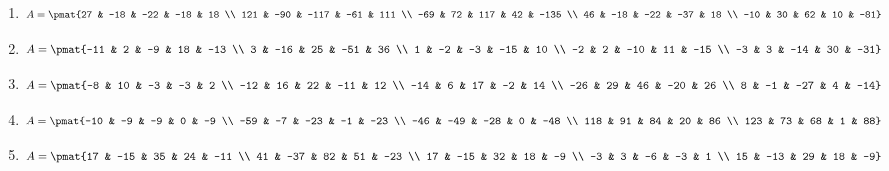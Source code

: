 \begin{enumerate}
\item

\begin{align*}
A = \pmat{27 & -18 & -22 & -18 & 18 \\ 121 & -90 & -117 & -61 & 111 \\ -69 & 72 & 117 & 42 & -135 \\ 46 & -18 & -22 & -37 & 18 \\ -10 & 30 & 62 & 10 & -81}
\end{align*}

\item

\begin{align*}
A = \pmat{-11 & 2 & -9 & 18 & -13 \\ 3 & -16 & 25 & -51 & 36 \\ 1 & -2 & -3 & -15 & 10 \\ -2 & 2 & -10 & 11 & -15 \\ -3 & 3 & -14 & 30 & -31}
\end{align*}

\item

\begin{align*}
A = \pmat{-8 & 10 & -3 & -3 & 2 \\ -12 & 16 & 22 & -11 & 12 \\ -14 & 6 & 17 & -2 & 14 \\ -26 & 29 & 46 & -20 & 26 \\ 8 & -1 & -27 & 4 & -14}
\end{align*}

\item

\begin{align*}
A = \pmat{-10 & -9 & -9 & 0 & -9 \\ -59 & -7 & -23 & -1 & -23 \\ -46 & -49 & -28 & 0 & -48 \\ 118 & 91 & 84 & 20 & 86 \\ 123 & 73 & 68 & 1 & 88}
\end{align*}

\item

\begin{align*}
A = \pmat{17 & -15 & 35 & 24 & -11 \\ 41 & -37 & 82 & 51 & -23 \\ 17 & -15 & 32 & 18 & -9 \\ -3 & 3 & -6 & -3 & 1 \\ 15 & -13 & 29 & 18 & -9}
\end{align*}


\end{enumerate}
